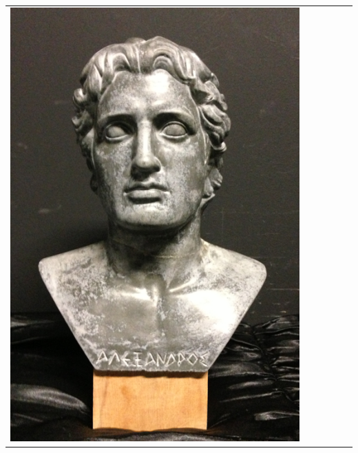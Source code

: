 \documentclass[final,12pt,3p]{elsarticle}
\begin{document}
\begin{table}
{\begin{tabular}{| c |  m{0.8cm} | m{0.8cm} | c | c | c |}
	\includegraphics[scale=0.05]{./images/alex_real.png} & 

\end{tabular}}
\end{table}
\end{document}
